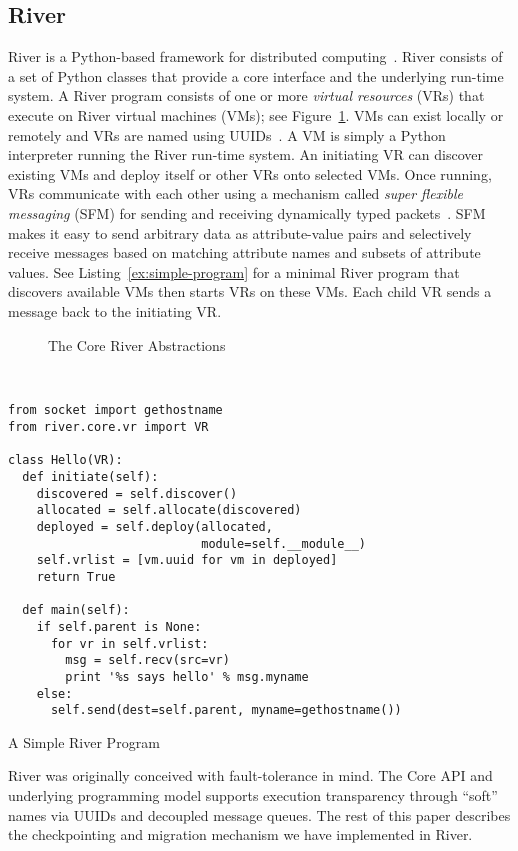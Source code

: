 \subsection{River}
\label{sec:River}

River is a Python-based framework for distributed
computing~\cite{River:2007}. River consists of a set of Python classes
that provide a core interface and the underlying run-time system. A
River program consists of one or more {\it virtual resources} (VRs)
that execute on River virtual machines (VMs); see
Figure~\ref{fig:core-execution}. VMs can exist locally or remotely and
VRs are named using UUIDs~\cite{RFC4122}. A VM is simply a Python
interpreter running the River run-time system. An initiating VR can
discover existing VMs and deploy itself or other VRs onto selected VMs.
Once running, VRs communicate with each other using a mechanism called
{\it super flexible messaging} (SFM) for sending and receiving
dynamically typed packets~\cite{Fedosov:2007:SFM}.  SFM makes it easy to send arbitrary data as attribute-value pairs and
selectively receive messages based on matching attribute names and subsets of
attribute values. 
See Listing~\ref{ex:simple-program} for a minimal River program that discovers available VMs then starts VRs on these VMs.  Each child VR sends a message back to the initiating VR.

\begin{figure}[htb]
\centering{}
\caption{The Core River Abstractions}\label{fig:core-execution}
\end{figure}


\begin{listing}
\scriptsize
\begin{verbatim}


from socket import gethostname
from river.core.vr import VR

class Hello(VR):
  def initiate(self):
    discovered = self.discover()
    allocated = self.allocate(discovered)
    deployed = self.deploy(allocated, 
                           module=self.__module__)
    self.vrlist = [vm.uuid for vm in deployed]
    return True

  def main(self):
    if self.parent is None:
      for vr in self.vrlist:
        msg = self.recv(src=vr)
        print '%s says hello' % msg.myname
    else:
      self.send(dest=self.parent, myname=gethostname())
\end{verbatim}
\normalsize
\caption{A Simple River Program}
\label{ex:simple-program}
\end{listing}

River was originally conceived with fault-tolerance in mind.  The Core API and underlying programming model supports execution transparency through ``soft'' names via UUIDs and decoupled message queues.  The rest of this paper describes the checkpointing and migration mechanism we have implemented in River.
